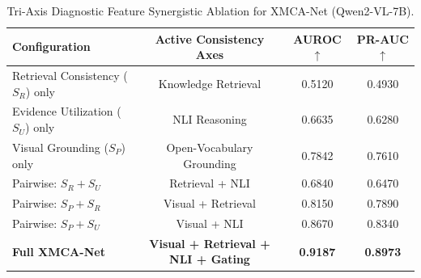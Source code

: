 \begin{table}[t]
\centering
\small
\caption{Tri-Axis Diagnostic Feature Synergistic Ablation for XMCA-Net (Qwen2-VL-7B).}
\label{tab:xmca_ablation}
\begin{tabular}{lccc}
\toprule
\textbf{Configuration} & \textbf{Active Consistency Axes} & \textbf{AUROC} $\uparrow$ & \textbf{PR-AUC} $\uparrow$ \\
\midrule
Retrieval Consistency ($S_R$) only & Knowledge Retrieval & 0.5120 & 0.4930 \\
Evidence Utilization ($S_U$) only & NLI Reasoning & 0.6635 & 0.6280 \\
Visual Grounding ($S_P$) only & Open-Vocabulary Grounding & 0.7842 & 0.7610 \\
Pairwise: $S_R + S_U$ & Retrieval + NLI & 0.6840 & 0.6470 \\
Pairwise: $S_P + S_R$ & Visual + Retrieval & 0.8150 & 0.7890 \\
Pairwise: $S_P + S_U$ & Visual + NLI & 0.8670 & 0.8340 \\
\midrule
\textbf{Full XMCA-Net} & \textbf{Visual + Retrieval + NLI + Gating} & \textbf{0.9187} & \textbf{0.8973} \\
\bottomrule
\end{tabular}
\end{table}